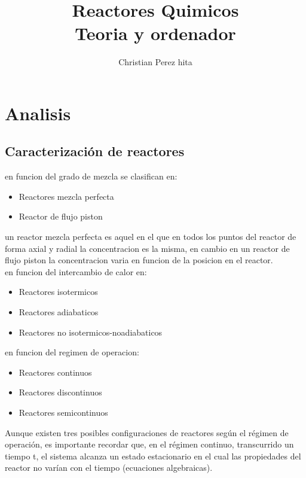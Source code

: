 \documentclass{report}
\title{\Huge{Reactores Quimicos}\\Teoria y ordenador}
\author{\huge{Christian Perez hita}}
\date{}
\begin{document}
\setcounter{tocdepth}{3}
\maketitle
\newpage%

\tableofcontents
\pagebreak

\chapter{Analisis}
\section{Caracterización de reactores}
\noindent en funcion del grado de mezcla se clasifican en:
\begin{itemize}
	\item Reactores mezcla perfecta
	\item Reactor de flujo piston
\end{itemize}
\par
\noindent un reactor mezcla perfecta es aquel en el que en todos los puntos del reactor de forma axial y radial la concentracion es la misma,
 en cambio en un reactor de flujo piston la concentracion varia en funcion de la posicion en el reactor.\\

 \noindent  en funcion del intercambio de calor en:
 \begin{itemize}
	\item Reactores isotermicos
	\item Reactores adiabaticos
	\item Reactores no isotermicos-noadiabaticos
\end{itemize}
\noindent en funcion del regimen de operacion:
\begin{itemize}
	\item Reactores continuos
	\item Reactores discontinuos
	\item Reactores semicontinuos
\end{itemize}
\noindent Aunque existen tres posibles configuraciones de reactores según el régimen de operación, es importante recordar que, en el régimen continuo, transcurrido un tiempo 
t, el sistema alcanza un estado estacionario en el cual las propiedades del reactor no varían con el tiempo (ecuaciones algebraicas).\\
\end{document}
